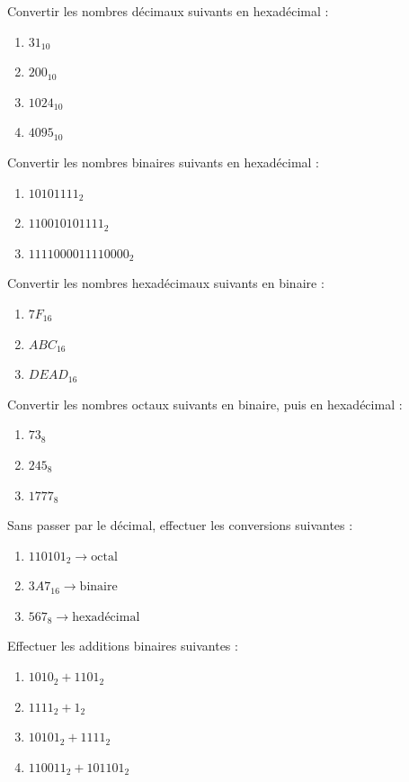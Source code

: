 \exo{}
Convertir les nombres décimaux suivants en hexadécimal :
\begin{enumerate}
    \item $31_{10}$
    \item $200_{10}$
    \item $1024_{10}$
    \item $4095_{10}$
\end{enumerate}

\exo{}
Convertir les nombres binaires suivants en hexadécimal :
\begin{enumerate}
    \item $10101111_2$
    \item $110010101111_2$
    \item $1111000011110000_2$
\end{enumerate}

\exo{}
Convertir les nombres hexadécimaux suivants en binaire :
\begin{enumerate}
    \item $7F_{16}$
    \item $ABC_{16}$
    \item $DEAD_{16}$
\end{enumerate}

\exo{}
Convertir les nombres octaux suivants en binaire, puis en hexadécimal :
\begin{enumerate}
    \item $73_8$
    \item $245_8$
    \item $1777_8$
\end{enumerate}

\exo{}
Sans passer par le décimal, effectuer les conversions suivantes :
\begin{enumerate}
    \item $110101_2 \rightarrow \text{octal}$
    \item $3A7_{16} \rightarrow \text{binaire}$
    \item $567_8 \rightarrow \text{hexadécimal}$
\end{enumerate}


\exo{}
Effectuer les additions binaires suivantes :
\begin{enumerate}
    \item $1010_2 + 1101_2$
    \item $1111_2 + 1_2$
    \item $10101_2 + 1111_2$
    \item $110011_2 + 101101_2$
\end{enumerate}


